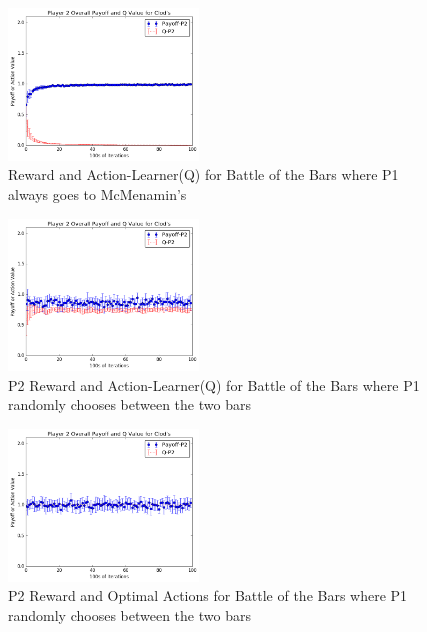 \documentclass[letterpaper, 10 pt, conference]{ieeeconf}  %
\begin{document}
\begin{figure}[ht]
\centering
\includegraphics[width=0.45\textwidth]{Scenario1}
\caption{Reward and Action-Learner(Q) for Battle of the Bars where P1 always goes to McMenamin's}
\label{scenario1}
\end{figure}
\begin{figure}[ht]
\centering
\includegraphics[width=0.45\textwidth]{Scenario2}
\caption{P2 Reward and Action-Learner(Q) for Battle of the Bars where P1 randomly chooses between the two bars}
\label{scenario2}
\end{figure}

\begin{figure}[ht]
\centering
\includegraphics[width=0.45\textwidth]{Scenario2_optimal}
\caption{P2 Reward and Optimal Actions for Battle of the Bars where P1 randomly chooses between the two bars}
\label{scenario2_optimal}
\end{figure}
\end{document}
